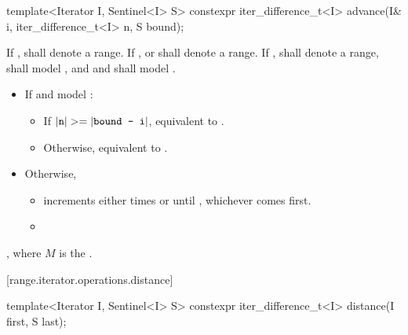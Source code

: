 \begin{addedblock}
%
\begin{itemdecl}
template<Iterator I, Sentinel<I> S>
  constexpr iter_difference_t<I> advance(I& i, iter_difference_t<I> n, S bound);
\end{itemdecl}

\begin{itemdescr}
\pnum
\expects
If ,  shall denote a range.
If ,  or  shall denote a range.
If ,  shall denote a range,
 shall model , and
 and  shall model .

\pnum
\effects
\begin{itemize}
\item If  and  model :
  \begin{itemize}
  \item If \brk{}$|\texttt{n}| >= |\texttt{bound - i}|$,
    equivalent to .
  \item Otherwise, equivalent to .
  \end{itemize}
\item Otherwise,
  \begin{itemize}
  \item {} increments
     either  times or until
     ,
    whichever comes first.
  \item {}
  \end{itemize}
\end{itemize}

\pnum
\returns
{}, where $M$ is the
.
\end{itemdescr}

[range.iterator.operations.distance]{}
%
\begin{itemdecl}
template<Iterator I, Sentinel<I> S>
  constexpr iter_difference_t<I> distance(I first, S last);
\end{itemdecl}


\end{addedblock}
